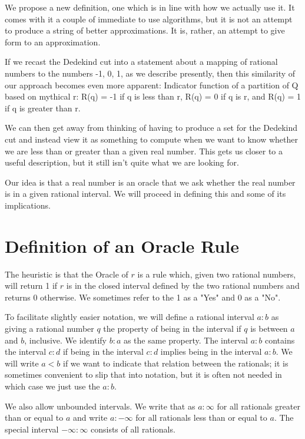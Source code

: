 \documentclass[12pt]{article}
\theoremstyle{remark}
\begin{document}
We propose a new definition, one which is in line with how we actually use it.
It comes with it a couple of immediate to use algorithms, but it is not an
attempt to produce a string of better approximations. It is, rather, an
attempt to give form to an approximation.

If we recast the Dedekind cut into a statement about a mapping of rational
numbers to the numbers -1, 0, 1, as we describe presently, then this
similarity of our approach becomes even more apparent: 
Indicator function of a partition of Q based on mythical r: 
R(q) = -1 if q is less than r, R(q) = 0 if q is r, and R(q) = 1 if q is
greater than r. 

We can then get away from thinking of having to produce a set for the Dedekind
cut and instead view it as something to compute when we want to know whether
we are less than or greater than a given real number. This gets us closer to a
useful description, but it still isn't quite what we are looking for. 

Our idea is that a real number is an oracle that we ask whether the real
number is in a given rational interval. We will proceed in defining this and
some of its implications. 



\section{Definition of an Oracle Rule}\label{sec:ora}

The heuristic is that the Oracle of $r$ is a rule which, given two rational numbers, will return 1 if
$r$ is in the closed interval defined by the two rational numbers and returns 0
otherwise. We sometimes refer to the 1 as a "Yes" and 0 as a "No".

To facilitate slightly easier notation, we will define a rational interval $a:b$ as giving a rational number $q$ the property of being in the interval if $q$ is between $a$ and $b$, inclusive. We identify $b:a$ as the same property. The interval $a:b$ contains the interval $c:d$ if being in the interval $c:d$ implies being in the interval $a:b$. We will write $a<b$ if we want to indicate that relation between the rationals; it is sometimes convenient to slip that into notation, but it is often not needed in which case we just use the $a:b$.

We also allow unbounded intervals. We write that as $a:\infty$ for all rationals greater than or equal to $a$ and write $a:-\infty$ for all rationals less than or equal to $a$. The special interval $-\infty:\infty$ consists of all rationals. 
\end{document}
